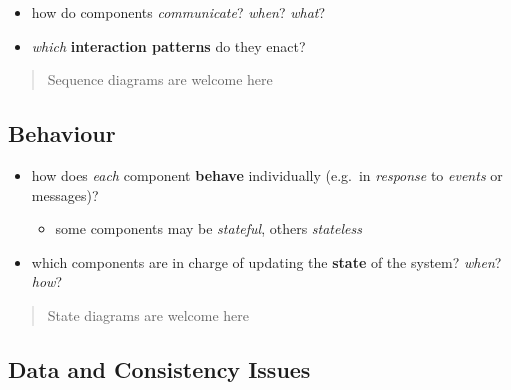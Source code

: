 \documentclass{scrartcl}
\begin{document}
\begin{itemize}
  \item how do components \emph{communicate}? \emph{when}? \emph{what}?
  \item \emph{which} \textbf{interaction patterns} do they enact?
\end{itemize}

\begin{quote}
Sequence diagrams are welcome here
\end{quote}

\subsection{Behaviour}\label{behaviour}

\begin{itemize}
  \item how does \emph{each} component \textbf{behave} individually (e.g.~in
  \emph{response} to \emph{events} or messages)?

  \begin{itemize}
    \item some components may be \emph{stateful}, others \emph{stateless}
  \end{itemize}
  \item which components are in charge of updating the \textbf{state} of the
  system? \emph{when}? \emph{how}?
\end{itemize}

\begin{quote}
State diagrams are welcome here
\end{quote}

\subsection{Data and Consistency
Issues}\label{data-and-consistency-issues}
\end{document}
